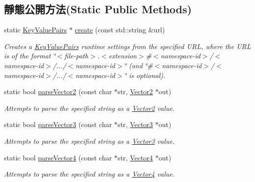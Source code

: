 \subsection*{靜態公開方法(Static Public Methods)}
\begin{DoxyCompactItemize}
\item 
static \hyperlink{class_i_dream_sky_1_1_key_value_pairs}{Key\+Value\+Pairs} $\ast$ \hyperlink{class_i_dream_sky_1_1_key_value_pairs_a6ac99641f6d730b5a80934abe6077ad0}{create} (const std\+::string \&url)
\begin{DoxyCompactList}\small\item\em Creates a \hyperlink{class_i_dream_sky_1_1_key_value_pairs}{Key\+Value\+Pairs} runtime settings from the specified U\+RL, where the U\+RL is of the format \char`\"{}$<$file-\/path$>$.$<$extension$>$\#$<$namespace-\/id$>$/$<$namespace-\/id$>$/.../$<$namespace-\/id$>$\char`\"{} (and \char`\"{}\#$<$namespace-\/id$>$/$<$namespace-\/id$>$/.../$<$namespace-\/id$>$\char`\"{} is optional). \end{DoxyCompactList}\item 
static bool \hyperlink{class_i_dream_sky_1_1_key_value_pairs_a45f1bca8fca83de948d2fc663084b4b3}{parse\+Vector2} (const char $\ast$str, \hyperlink{class_i_dream_sky_1_1_vector2}{Vector2} $\ast$out)
\begin{DoxyCompactList}\small\item\em Attempts to parse the specified string as a \hyperlink{class_i_dream_sky_1_1_vector2}{Vector2} value. \end{DoxyCompactList}\item 
static bool \hyperlink{class_i_dream_sky_1_1_key_value_pairs_a0d290c8ffbc8e7d4ab585eecc4b5b850}{parse\+Vector3} (const char $\ast$str, \hyperlink{class_i_dream_sky_1_1_vector3}{Vector3} $\ast$out)
\begin{DoxyCompactList}\small\item\em Attempts to parse the specified string as a \hyperlink{class_i_dream_sky_1_1_vector3}{Vector3} value. \end{DoxyCompactList}\item 
static bool \hyperlink{class_i_dream_sky_1_1_key_value_pairs_a4d02aaafbb0e74914fbb6ff8b8777397}{parse\+Vector4} (const char $\ast$str, \hyperlink{class_i_dream_sky_1_1_vector4}{Vector4} $\ast$out)
\begin{DoxyCompactList}\small\item\em Attempts to parse the specified string as a \hyperlink{class_i_dream_sky_1_1_vector4}{Vector4} value. \end{DoxyCompactList}\item 

\end{DoxyCompactItemize}
